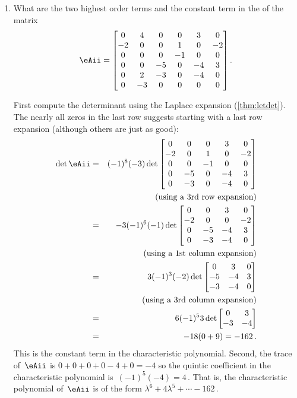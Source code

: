 \begin{example}
\begin{enumerate}
\item What are the two highest order terms and the constant term in the  of the matrix
\begin{equation*}
\eAii=\begin{bmatrix}0&4&0&0&3&0
\\-2&0&0&1&0&-2
\\0&0&0&-1&0&0
\\0&0&-5&0&-4&3
\\0&2&-3&0&-4&0
\\0&-3&0&0&0&0\end{bmatrix}.
\end{equation*}
\begin{solution} 
First compute the determinant using the Laplace expansion (\autoref{thm:letdet}).  
The nearly all zeros in the last row suggests starting with a last row expansion (although others are just as good):
\begin{eqnarray*}
\det \eAii&=&(-1)^8(-3)\det\begin{bmatrix}0&0&0&3&0
\\-2&0&1&0&-2
\\0&0&-1&0&0
\\0&-5&0&-4&3
\\0&-3&0&-4&0\end{bmatrix}
\\&&(\text{using a 3rd row expansion})
\\&=&-3(-1)^6(-1)\det\begin{bmatrix}0&0&3&0
\\-2&0&0&-2
\\0&-5&-4&3
\\0&-3&-4&0\end{bmatrix}
\\&&(\text{using a 1st column expansion})
\\&=&3(-1)^3(-2)\det\begin{bmatrix}0&3&0
\\-5&-4&3
\\-3&-4&0\end{bmatrix}
\\&&(\text{using a 3rd column expansion})
\\&=&6(-1)^53\det\begin{bmatrix}0&3
\\-3&-4\end{bmatrix}
\\&=&-18(0+9)=-162\,.
\end{eqnarray*}
This is the constant term in the characteristic polynomial.
Second, the trace of~\(\eAii\) is \(0+0+0+0-4+0=-4\) so the quintic coefficient in the characteristic polynomial is~\((-1)^5(-4)=4\)\,.
That is, the characteristic polynomial of~\(\eAii\) is of the form \(\lambda^6+4\lambda^5+\cdots-162\)\,.
\end{solution}

\end{enumerate}
\end{example}






